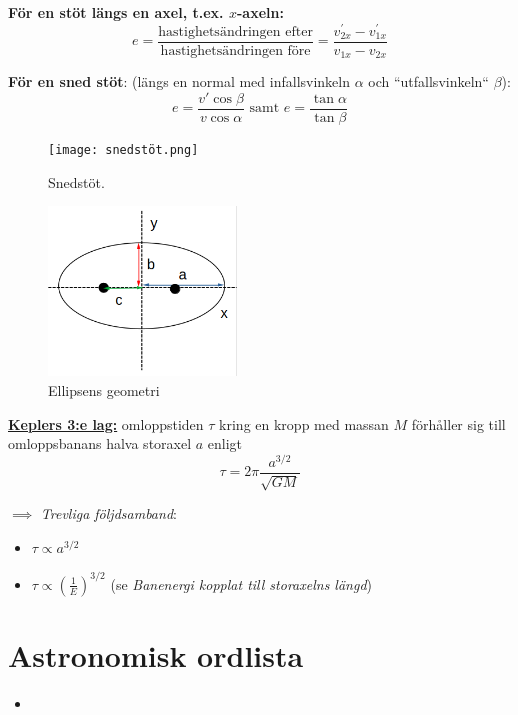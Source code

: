 \documentclass{article}
\newenvironment{ankiflashcard}[1]{}{}
\begin{document}
\begin{paracol}{2}
\begin{ankiflashcard}{Ange de olika formlerna för studstal, inklusive snedstöt.}
    
\textbf{För en stöt längs en axel, t.ex. $x$-axeln:}
$$
e=\frac{\text{hastighetsändringen efter}}{\text{hastighetsändringen före}}=\frac{v_{2x}^{\prime}-{v_{1x}^{\prime}}}{v_{1x}-v_{2x}}
$$


\textbf{För en sned stöt}:
(längs en normal med infallsvinkeln $\alpha$ och ``utfallsvinkeln`` $\beta$):
$$
e=\frac{v'\cos\beta}{v\cos\alpha}\text{ samt } e =\frac{\tan \alpha}{\tan \beta}
$$
\begin{figure}[H]
    \centering
\texttt{[image: snedstöt.png]}
    \caption{Snedstöt.}
\end{figure}
\end{ankiflashcard}

\begin{ankiflashcard}{Rita upp de olika sträckorna i en ellips.}
    
\begin{figure}[H]
    \centering
    \includegraphics[width=5cm]{ellipsens_geometri.png}
    \caption{Ellipsens geometri}
\end{figure}
\end{ankiflashcard}

\begin{ankiflashcard}{Formulera Keplers 3:e lag}
\underline{\textbf{Keplers 3:e lag:}} omloppstiden $\tau$ kring en kropp med massan $M$ förhåller sig till omloppsbanans halva storaxel $a$ enligt
$$
\tau = 2\pi \frac{a^{3/2}}{\sqrt{GM}}
$$
\end{ankiflashcard}

\begin{ankiflashcard}{Formulera några trevliga följdsamband för Keplers tredje lag}
$\implies$ \textit{Trevliga följdsamband}:
\begin{itemize}
    \item $\tau \propto a^{3/2}$
    \item $\tau \propto (\frac{1}{E})^{3/2}$ (se \textit{Banenergi kopplat till storaxelns längd})
\end{itemize}
\end{ankiflashcard}
\end{paracol}
\newpage
\appendices
\section{Astronomisk ordlista}
\begin{itemize}
    \item 
\end{itemize}
\end{document}
